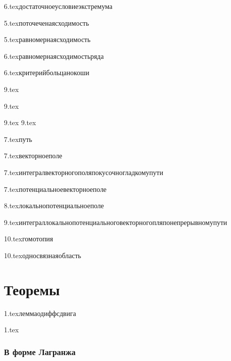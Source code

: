 {6.tex}{достаточноеусловиеэкстремума}

{5.tex}{поточеченаясходимость}

{5.tex}{равномернаясходимость}

{6.tex}{равномернаясходимостьряда}

{6.tex}{критерийбольцанокоши}

{9.tex}{}


{9.tex}{}
\?

{9.tex}{}\?
{9.tex}{}\?

{7.tex}{путь}

{7.tex}{векторноеполе}

{7.tex}{интегралвекторногополяпокусочногладкомупути}

{7.tex}{потенциальноевекторноеполе}

{8.tex}{локальнопотенциальноеполе}

{9.tex}{интеграллокальнопотенциальноговекторногопляпонепрерывномупути}

{10.tex}{гомотопия}

{10.tex}{односвязнаяобласть}

\section{Теоремы}

{1.tex}{леммаодиффсдвига}

{1.tex}{}
\subsubsection{В форме Лагранжа}
